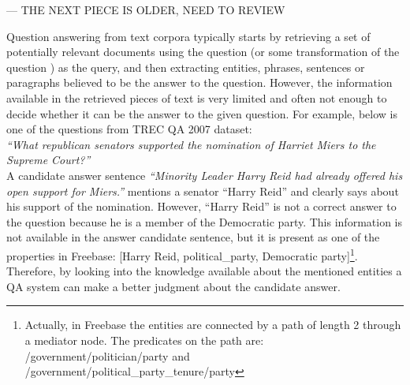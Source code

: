 --- THE NEXT PIECE IS OLDER, NEED TO REVIEW

Question answering from text corpora typically starts by retrieving a set of potentially relevant documents using the question (or some transformation of the question \cite{AgichteinLG01}) as the query, and then extracting entities, phrases, sentences or paragraphs believed to be the answer to the question.
However, the information available in the retrieved pieces of text is very limited and often not enough to decide whether it can be the answer to the given question.
For example, below is one of the questions from TREC QA 2007 dataset:\\
\textit{``What republican senators supported the nomination of Harriet Miers to the Supreme Court?''}\\
A candidate answer sentence \textit{``Minority Leader Harry Reid had already offered his open support for Miers.''} mentions a senator ``Harry Reid'' and clearly says about his support of the nomination.
However, ``Harry Reid'' is not a correct answer to the question because he is a member of the Democratic party.
This information is not available in the answer candidate sentence, but it is present as one of the properties in Freebase: [Harry Reid, political\_party, Democratic party]\footnote{Actually, in Freebase the entities are connected by a path of length 2 through a mediator node. The predicates on the path are: /government/politician/party and /government/political\_party\_tenure/party}.
Therefore, by looking into the knowledge available about the mentioned entities a QA system can make a better judgment about the candidate answer.



